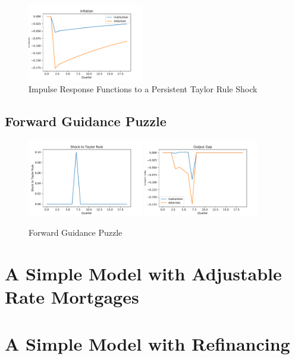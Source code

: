 \documentclass[AER]{AEA}
\begin{document}
\begin{figure}
	\includegraphics[width=0.45\textwidth]{../Code/Dolo/Figures/inflation.pdf}
	\caption{Impulse Response Functions to a Persistent Taylor Rule Shock}
	\label{fig:ImpulseResponse}
\end{figure}
\subsection{Forward Guidance Puzzle}
\begin{figure}
	\includegraphics[width=0.45\textwidth]{../Code/Dolo/Figures/shock_fwd_guid.pdf}
	\includegraphics[width=0.45\textwidth]{../Code/Dolo/Figures/output_fwd_guid.pdf}
	\caption{Forward Guidance Puzzle}
	\label{fig:FwdGuidance}
\end{figure}



\section{A Simple Model with Adjustable Rate Mortgages}


\section{A Simple Model with Refinancing}




\appendix
\end{document}
